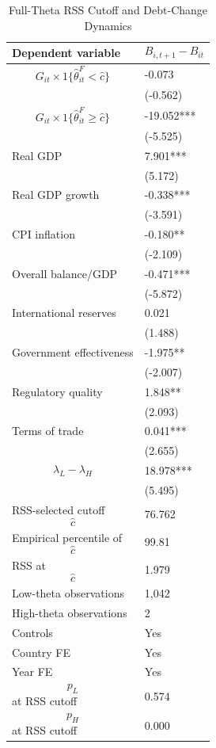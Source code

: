 \begin{table}[H]\centering
\begin{threeparttable}
\caption{Full-Theta RSS Cutoff and Debt-Change Dynamics}
\label{tab:deltaB_rss_cutoff_fulltheta}
\scriptsize
\begin{tabularx}{\textwidth}{lY}
\toprule
Dependent variable & $$B_{i,t+1}-B_{it}$$ \\
\midrule
$$G_{it}\times 1\{\widehat{\theta}^{F}_{it}<\widehat{c}\}$$ & -0.073 \\
 & (-0.562) \\
$$G_{it}\times 1\{\widehat{\theta}^{F}_{it}\geq\widehat{c}\}$$ & -19.052*** \\
 & (-5.525) \\
Real GDP & 7.901*** \\
 & (5.172) \\
Real GDP growth & -0.338*** \\
 & (-3.591) \\
CPI inflation & -0.180** \\
 & (-2.109) \\
Overall balance/GDP & -0.471*** \\
 & (-5.872) \\
International reserves & 0.021 \\
 & (1.488) \\
Government effectiveness & -1.975** \\
 & (-2.007) \\
Regulatory quality & 1.848** \\
 & (2.093) \\
Terms of trade & 0.041*** \\
 & (2.655) \\
$$\lambda_L-\lambda_H$$ & 18.978*** \\
 & (5.495) \\
\midrule
RSS-selected cutoff $$\widehat{c}$$ & 76.762 \\
Empirical percentile of $$\widehat{c}$$ & 99.81 \\
RSS at $$\widehat{c}$$ & 1.979 \\
Low-theta observations & 1,042 \\
High-theta observations & 2 \\
Controls & Yes \\
Country FE & Yes \\
Year FE & Yes \\
$$p_L$$ at RSS cutoff & 0.574 \\
$$p_H$$ at RSS cutoff & 0.000 \\

\end{tabularx}
\end{threeparttable}
\end{table}
